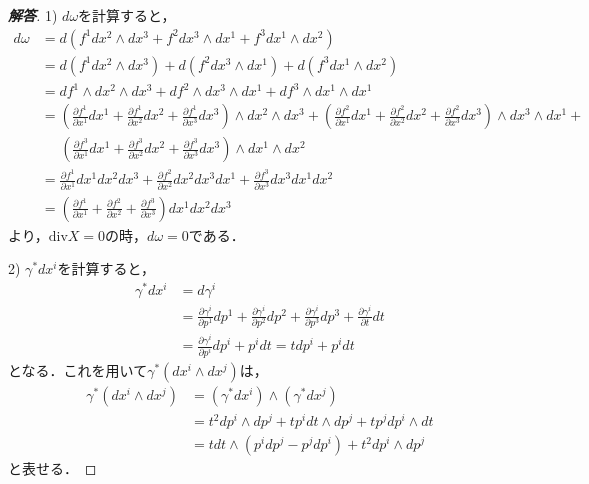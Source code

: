 \documentclass[dvipdfmx,nosetpagesize, uplatex]{jsarticle}
\theoremstyle{definition}
\theoremstyle{StatementsWithStar}
\theoremstyle{StatementsWithStar2}
\theoremstyle{StatementsWithStar3}
\theoremstyle{StatementsWithCCirc}
\theoremstyle{definition}
\begin{document}
\begin{proof}[\bf{解答}]
    
1) $d\omega$を計算すると，
\begin{align*}
    d\omega &= d\left(f^1dx^2\wedge dx^3+f^2dx^3\wedge dx^1+f^3dx^1\wedge dx^2\right) \\
    &= d(f^1dx^2\wedge dx^3)+ d(f^2dx^3\wedge dx^1)+d(f^3dx^1\wedge dx^2) \\
    &= df^1\wedge dx^2\wedge dx^3 + df^2\wedge dx^3\wedge dx^1 + df^3\wedge dx^1\wedge dx^1 \\
    &= \left( \frac{\partial f^1}{\partial x^1}dx^1 + \frac{\partial f^1}{\partial x^2}dx^2 + \frac{\partial f^1}{\partial x^3}dx^3 \right)\wedge dx^2\wedge dx^3 + 
    \left( \frac{\partial f^2}{\partial x^1}dx^1 + \frac{\partial f^2}{\partial x^2}dx^2 + \frac{\partial f^2}{\partial x^3}dx^3 \right)\wedge dx^3\wedge dx^1 + \\
    &\;\;\;\;\;\left( \frac{\partial f^3}{\partial x^1}dx^1 + \frac{\partial f^3}{\partial x^2}dx^2 + \frac{\partial f^3}{\partial x^3}dx^3 \right)\wedge dx^1\wedge dx^2\\
    &= \frac{\partial f^1}{\partial x^1}dx^1dx^2dx^3 + \frac{\partial f^2}{\partial x^2}dx^2dx^3dx^1 + \frac{\partial f^3}{\partial x^3}dx^3dx^1dx^2 \\
    &= \left( \frac{\partial f^1}{\partial x^1} + \frac{\partial f^2}{\partial x^2} + \frac{\partial f^3}{\partial x^3} \right)dx^1dx^2dx^3
\end{align*}
より，$\mathrm{div} X=0$の時，$d\omega=0$である．

2) $\gamma^*dx^i$を計算すると，
\begin{align*}
    \gamma^*dx^i  &= d\gamma^i \\
    &= \frac{\partial\gamma^i}{\partial p^1}dp^1 + \frac{\partial\gamma^i}{\partial p^2}dp^2 + \frac{\partial\gamma^i}{\partial p^3}dp^3 + \frac{\partial\gamma^i}{\partial t}dt \\
    &= \frac{\partial\gamma^i}{\partial p^i}dp^i + p^idt = tdp^i +  p^idt
\end{align*}
となる．これを用いて$\gamma^*(dx^i\wedge dx^j)$は，
\begin{align*}
    \gamma^*(dx^i\wedge dx^j) &= (\gamma^*dx^i) \wedge (\gamma^*dx^j) \\
    &= t^2dp^i\wedge dp^j + tp^idt\wedge dp^j + tp^jdp^i\wedge dt\\
    &= tdt\wedge (p^idp^j-p^jdp^i) + t^2dp^i\wedge dp^j
\end{align*}
と表せる．


\end{proof}
\end{document}
